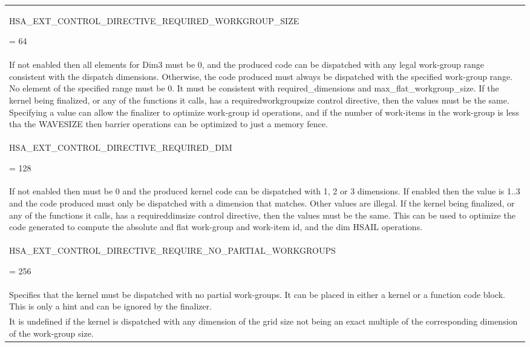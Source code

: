 \documentclass[final]{book}
\newcommand{\reftyp}[1]{#1}
\newcommand{\refenu}[1]{\reftyp{#1}}
\begin{document}
\begin{longtable}{@{\hspace{2em}}p{\linewidth-2em}}
\hspace{-2em}\hypertarget{group__FinalizerCoreApi_1gga143d9e622dfd7889d52fb5eb5ed1ffdbab26301028f39a1ac099aae9e74251438}{\refenu{HSA_EXT_CONTROL_DIRECTIVE_REQUIRED_WORKGROUP_SIZE}} = 64\\If not enabled then all elements for Dim3 must be 0, and the produced code can be dispatched with any legal work-group range consistent with the dispatch dimensions. Otherwise, the code produced must always be dispatched with the specified work-group range. No element of the specified range must be 0. It must be consistent with required_dimensions and max_flat_workgroup_size. If the kernel being finalized, or any of the functions it calls, has a requiredworkgroupsize control directive, then the values must be the same. Specifying a value can allow the finalizer to optimize work-group id operations, and if the number of work-items in the work-group is less tha the WAVESIZE then barrier operations can be optimized to just a memory fence.\\[2mm]
\hspace{-2em}\hypertarget{group__FinalizerCoreApi_1gga143d9e622dfd7889d52fb5eb5ed1ffdba87989d5d2c63b0bb44b15e0788bfe850}{\refenu{HSA_EXT_CONTROL_DIRECTIVE_REQUIRED_DIM}} = 128\\If not enabled then must be 0 and the produced kernel code can be dispatched with 1, 2 or 3 dimensions. If enabled then the value is 1..3 and the code produced must only be dispatched with a dimension that matches. Other values are illegal. If the kernel being finalized, or any of the functions it calls, has a requireddimsize control directive, then the values must be the same. This can be used to optimize the code generated to compute the absolute and flat work-group and work-item id, and the dim HSAIL operations.\\[2mm]
\hspace{-2em}\hypertarget{group__FinalizerCoreApi_1gga143d9e622dfd7889d52fb5eb5ed1ffdba5b5049bc2b376e60b9b92337e343ee18}{\refenu{HSA_EXT_CONTROL_DIRECTIVE_REQUIRE_NO_PARTIAL_WORKGROUPS}} = 256\\Specifies that the kernel must be dispatched with no partial work-groups. It can be placed in either a kernel or a function code block. This is only a hint and can be ignored by the finalizer.\\[2mm]
It is undefined if the kernel is dispatched with any dimension of the grid size not being an exact multiple of the corresponding dimension of the work-group size.\\[2mm]

\end{longtable}
\end{document}

